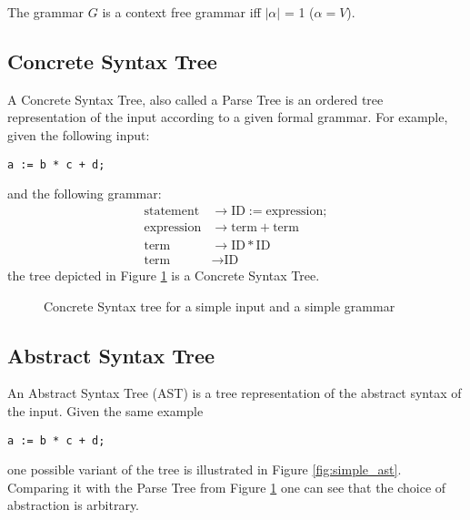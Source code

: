 \begin{defn}
  The grammar $G$ is a context free grammar iff $|\alpha|$ = 1 ($\alpha = V$).
\end{defn}

\subsection{Concrete Syntax Tree}

A Concrete Syntax Tree, also called a Parse Tree is an ordered tree
representation of the input according to a given formal grammar.
For example, given the following input:
\begin{lstlisting}
a := b * c + d;
\end{lstlisting}
and the following grammar:
\begin{align*}
  \textrm{statement}  & \rightarrow \textrm{ID} := \textrm{expression} ; \\
  \textrm{expression} & \rightarrow \textrm{term} + \textrm{term} \\
  \textrm{term}       & \rightarrow \textrm{ID} * \textrm{ID} \\
  \textrm{term}       & \rightarrow \textrm{ID}
\end{align*}
the tree depicted in Figure \ref{fig:simple_cst} is a Concrete Syntax Tree.

\begin{figure}[hbt!]
  \centering
  \caption{Concrete Syntax tree for a simple input and a simple grammar}
  \label{fig:simple_cst}
\end{figure}

\subsection{Abstract Syntax Tree}

An Abstract Syntax Tree (AST) is a tree representation of the abstract
syntax of the input. Given the same example
\begin{lstlisting}
a := b * c + d;
\end{lstlisting}
one possible variant of the tree is illustrated in Figure
\ref{fig:simple_ast}. Comparing it with the Parse Tree from Figure
\ref{fig:simple_cst} one can see that the choice of abstraction is
arbitrary.

